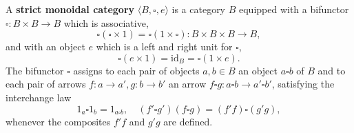 A \textbf{strict monoidal category} $\langle B, \square, e \rangle$ is a category $B$ equipped with a bifunctor $\square : B \times B \rightarrow B$ which is associative,
$$\square(\square \times 1) = \square(1 \times \square) : B \times B \times B \rightarrow B,$$
and with an object $e$ which is a left and right unit for $\square$,
$$\square(e \times 1) = \mathrm{id}_B = \square(1 \times e).$$
The bifunctor $\square$ assigns to each pair of objects $a, b \in B$ an object $a \square b$ of $B$ and to each pair of arrows $f : a \rightarrow a', g : b \rightarrow b'$ an arrow $f \square g : a \square b \rightarrow a' \square b'$, satisfying the interchange law
$$1_a \square 1_b = 1_{a \square b}, \quad (f' \square g') (f \square g) = (f' f) \square (g' g),$$
whenever the composites $f'f$ and $g'g$ are defined.
